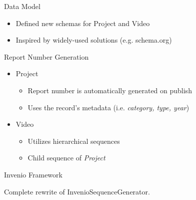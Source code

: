\documentclass{beamer}
\newcommand{\contrib}[1]{
  \vfill
  \begin{alertblock}{Invenio Framework}
    #1
  \end{alertblock}
}
\begin{document}
  	\begin{frame}{Data Model}
    	\begin{itemize}
    	  \item{Defined new schemas for \alert{Project} and \alert{Video}}
   	  \item{Inspired by widely-used solutions (e.g. schema.org)}
	  \end{itemize}
	\end{frame}
	
	\begin{frame}{Report Number Generation}
	  \begin{itemize}	  
    	  \item{\alert{Project}}
      	\begin{itemize}
      	  \item{Report number is automatically generated on publish}
      	  \item{Uses the record's metadata (i.e. \emph{category, type, year})}
    	  \end{itemize}
    	  \item{\alert{Video}}
      	\begin{itemize}
      	  \item{Utilizes hierarchical sequences}
      	  \item{Child sequence of \emph{Project}}
    	  \end{itemize}
  	  \end{itemize}

  	   \contrib{
		  Complete rewrite of \alert{InvenioSequenceGenerator}.
		}    	
	\end{frame}
\end{document}
